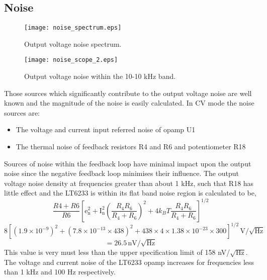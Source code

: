 \documentclass[a4paper,10pt, oneside]{article}
\begin{document}
\subsection*{Noise}
\begin{figure}[H]
	\begin{centering}	
		\texttt{[image: noise\_spectrum.eps]}
		\caption{Output voltage noise spectrum.}\label{noise_spectrum}
	\end{centering}	
\end{figure}
\begin{figure}[H]
	\begin{centering}	
		\texttt{[image: noise\_scope\_2.eps]}
		\caption{Output voltage noise within the 10-10 kHz band.}\label{noise_scope}
	\end{centering}	
\end{figure}
Those sources which significantly contribute to the output voltage noise are well known and the magnitude of the noise is easily calculated. In CV mode the noise sources are:
\begin{itemize}
	\item The voltage and current input referred noise of opamp U1
	\item The thermal noise of feedback resistors R4 and R6 and potentiometer R18
\end{itemize}
Sources of noise within the feedback loop have minimal impact upon the output noise since the negative feedback loop minimises their influence. The output voltage noise density at frequencies greater than about 1 kHz, such that R18 has little effect and the LT6233 is within its flat band noise region is calculated to be,
\begin{equation}
\frac{R4+R6}{R6}\left[\textrm{e}_{\textrm{n}}^{2} + \textrm{I}_{\textrm{n}}^{2}\left(\frac{R_{4}R_{6}}{R_{4}+R_{6}}\right)^{2} + 4k_{B}T\frac{R_{4}R_{6}}{R_{4}+R_{6}}\right]^{1/2}
\end{equation}
\begin{equation}
8\left[\left(1.9\times 10^{-9}\right)^{2} + (7.8\times 10^{-13}\times 438)^{2} + 438\times 4\times 1.38\times 10^{-23}\times 300\right]^{1/2}\, \textrm{V}/\sqrt{\textrm{Hz}}
\end{equation}
\begin{equation}
 = 26.5\, \textrm{nV}/\sqrt{\textrm{Hz}}
\end{equation}
This value is very must less than the upper specification limit of 158 nV/$\sqrt{\textrm{Hz}}$. The voltage and current noise of the LT6233 opamp increases for frequencies less than 1 kHz and 100 Hz respectively. 
\end{document}
